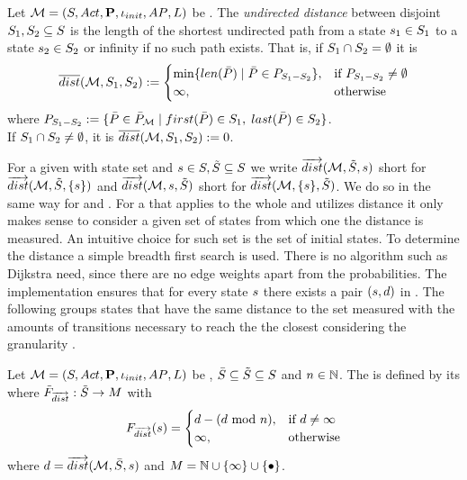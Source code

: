 \documentclass[preview]{standalone}
\begin{document}
\begin{definition}
	Let ${{{\mathcal{M}}}} = {{({S}, {Act}, {\textbf{P}}, {\iota_{init}}, {AP}, {L})}}$ be \achgphN. The \emph{undirected distance} between disjoint ${S}_1, {S}_2 \subseteq {S}$ is the length of the shortest undirected path from a state ${s}_1 \in {S}_1$ to a state ${s}_2 \in {S}_2$  or infinity if no such path exists. That is, if ${S}_1 \cap {S}_2 = \emptyset$ it is		
	\[
	{\overline{dist}}({{{\mathcal{M}}}}, {S}_1, {S}_2) := 
	\begin{cases}
		\min\{{len}({\bar{{P}}}) \mid {\bar{\ensuremath{{P}}}} \in P_{{S}_1 - {S}_2}\}, &\text{if } P_{{S}_1 - {S}_2} \neq \emptyset \\
		\infty, &\text{otherwise}
	\end{cases}
	\]
	where $P_{\states_1 - \states_2} := \{\pathbi \in \pathbiset \mid \pfirst(\pathbi) \in \states_1, \; \plast(\pathbi) \in \states_2\}$. \\
	\noindent
	If ${S}_1 \cap {S}_2 \neq \emptyset$, it is ${\overline{dist}}({{{\mathcal{M}}}}, {S}_1, {S}_2) := 0$.
\end{definition}

For a given \chgphN \chgph with state set \states and ${s} \in {S}, {\tilde{{S}}} \subseteq {S}$ we write ${\overrightarrow{dist}}({{\mathcal{M}}}, {\tilde{{S}}}, {s})$ short for ${\overrightarrow{dist}}({{\mathcal{M}}}, {\tilde{{S}}}, \{{s}\})$ and ${\overrightarrow{dist}}({{\mathcal{M}}}, {s}, {\tilde{{S}}})$ short for ${\overrightarrow{dist}}({{\mathcal{M}}}, \{{s}\}, {\tilde{{S}}})$. We do so in the same way for \distpathbi and \distpathrev.
For a \viewN that applies to the whole and utilizes distance it only makes sense to consider a given set of states from which one the distance is measured. An intuitive choice for such set is the set of initial states. To determine the distance a simple breadth first search is used. There is no algorithm such as Dijkstra need, since there are no edge weights apart from the probabilities. 
The implementation ensures that for every state ${s}$ there exists a pair $({s}, {d})$ in \fctdistdefault. The following \viewN groups states that have the same distance to the set measured with the amounts of transitions necessary to reach the the closest \smstates considering the granularity \grandist.

\begin{definition}
		Let ${{{\mathcal{M}}}} = {{({S}, {Act}, {\textbf{P}}, {\iota_{init}}, {AP}, {L})}}$ be \achgphN, $\bar{{S}} \subseteq {\tilde{\ensuremath{{S}}}} \subseteq {S}$ and $n \in {\mathbb{N}}$. The \viewN \viewdistance is defined by its \grpfctN \gfctdistance where ${{\tilde{F}_{{{\overrightarrow{dist}}}}}} : {\tilde{{S}}} \to {\ensuremath{{M}}}$ with 
		\[
		{{F_{{{\overrightarrow{dist}}}}}}({s}) =
		\begin{cases}
			 {d} - ({d} \text{ mod } n), &\text{if } d \neq \infty \\
			 \infty, &\text{otherwise}
		\end{cases}		
		\]
		where ${d} = {\overrightarrow{dist}}({{{\mathcal{M}}}},\bar{{S}}, {s})$ and $\imggrp = \natnums \cup \{\infty\} \cup \remset$.
\end{definition}
\end{document}
